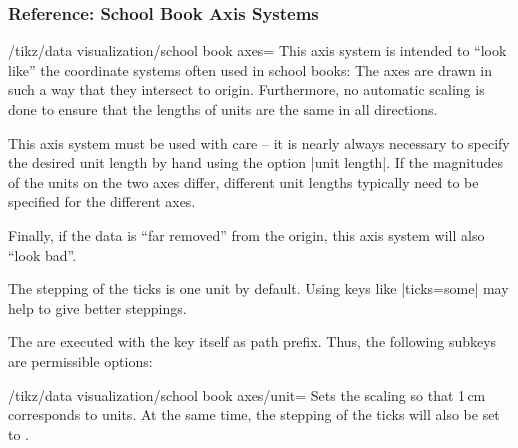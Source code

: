 \subsubsection{Reference: School Book Axis Systems}

\begin{key}{/tikz/data visualization/school book axes=}
    This axis system is intended to ``look like'' the coordinate systems often
    used in school books: The axes are drawn in such a way that they intersect
    to origin. Furthermore, no automatic scaling is done to ensure that the
    lengths of units are the same in all directions.

    This axis system must be used with care -- it is nearly always necessary to
    specify the desired unit length by hand using the option |unit length|. If
    the magnitudes of the units on the two axes differ, different unit lengths
    typically need to be specified for the different axes.

    Finally, if the data is ``far removed'' from the origin, this axis system
    will also ``look bad''.
\begin{codeexample}[preamble={\usetikzlibrary{datavisualization.formats.functions}}]
\end{codeexample}

    The stepping of the ticks is one unit by default. Using keys like
    |ticks=some| may help to give better steppings.

    The  are executed with the key itself as path prefix. Thus,
    the following subkeys are permissible options:
    \begin{key}{/tikz/data visualization/school book axes/unit=}
        Sets the scaling so that 1\,cm corresponds to  units. At
        the same time, the stepping of the ticks will also be set to
        .
\begin{codeexample}[preamble={\usetikzlibrary{datavisualization.formats.functions}}]
\end{codeexample}
    \end{key}


\end{key}
